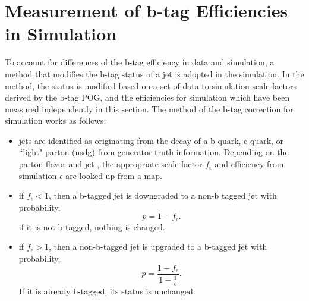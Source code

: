 \section{Measurement of b-tag Efficiencies in Simulation}
\label{sec:app:btag}




To account for differences of the b-tag efficiency in data and simulation, a method that modifies the b-tag status of a jet is adopted in the simulation. In the method, the status is modified based on a set of data-to-simulation scale factors derived by the b-tag POG, and the efficiencies for simulation which have been measured independently in this section.  The method of the b-tag correction for simulation works as follows:

\begin{itemize}

    \item jets are identified as originating from the decay of a b quark, c quark, or ``light" parton (usdg) from generator truth information. Depending on the parton flavor and jet \pt, the appropriate scale factor $f_{\epsilon}$ and efficiency from simulation $\epsilon$ are looked up from a map.
    
    \item if $f_{\epsilon} < 1$, then a b-tagged jet is downgraded to a non-b tagged jet with probability,
        \begin{equation}
            p = 1 - f_{\epsilon}.
        \end{equation}
        \noindent if it is not b-tagged, nothing is changed.
    
    
    \item if $f_{\epsilon} > 1$, then a non-b-tagged jet is upgraded to a b-tagged jet with probability,
        \begin{equation}
            p = \frac{1 - f_{\epsilon}}{1 - \frac{1}{\epsilon}}.
        \end{equation}
        \noindent If it is already b-tagged, its status is unchanged.
\end{itemize}


